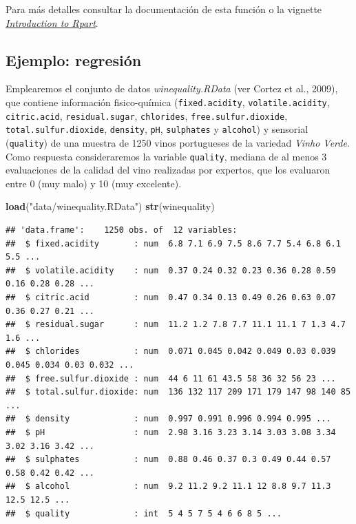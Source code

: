 \documentclass[
]{book}
\newenvironment{Shaded}{\begin{snugshade}}{\end{snugshade}}
\newcommand{\KeywordTok}[1]{\textcolor[rgb]{0.13,0.29,0.53}{\textbf{#1}}}
\newcommand{\NormalTok}[1]{#1}
\newcommand{\StringTok}[1]{\textcolor[rgb]{0.31,0.60,0.02}{#1}}
\theoremstyle{break}
\theoremstyle{definition}
\theoremstyle{definition}
\theoremstyle{definition}
\theoremstyle{remark}
\begin{document}
Para más detalles consultar la documentación de esta función o la vignette \href{https://cran.r-project.org/web/packages/rpart/vignettes/longintro.pdf}{\emph{Introduction to Rpart}}.

\hypertarget{ejemplo-regresiuxf3n}{%
\subsection{Ejemplo: regresión}\label{ejemplo-regresiuxf3n}}

Emplearemos el conjunto de datos \emph{winequality.RData} (ver Cortez et al., 2009), que contiene información fisico-química
(\texttt{fixed.acidity}, \texttt{volatile.acidity}, \texttt{citric.acid}, \texttt{residual.sugar}, \texttt{chlorides}, \texttt{free.sulfur.dioxide},
\texttt{total.sulfur.dioxide}, \texttt{density}, \texttt{pH}, \texttt{sulphates} y \texttt{alcohol}) y sensorial (\texttt{quality})
de una muestra de 1250 vinos portugueses de la variedad \emph{Vinho Verde}.
Como respuesta consideraremos la variable \texttt{quality}, mediana de al menos 3 evaluaciones de la calidad del vino
realizadas por expertos, que los evaluaron entre 0 (muy malo) y 10 (muy excelente).

\begin{Shaded}
\begin{Highlighting}[]
\KeywordTok{load}\NormalTok{(}\StringTok{"data/winequality.RData"}\NormalTok{)}
\KeywordTok{str}\NormalTok{(winequality)}
\end{Highlighting}
\end{Shaded}

\begin{verbatim}
## 'data.frame':    1250 obs. of  12 variables:
##  $ fixed.acidity       : num  6.8 7.1 6.9 7.5 8.6 7.7 5.4 6.8 6.1 5.5 ...
##  $ volatile.acidity    : num  0.37 0.24 0.32 0.23 0.36 0.28 0.59 0.16 0.28 0.28 ...
##  $ citric.acid         : num  0.47 0.34 0.13 0.49 0.26 0.63 0.07 0.36 0.27 0.21 ...
##  $ residual.sugar      : num  11.2 1.2 7.8 7.7 11.1 11.1 7 1.3 4.7 1.6 ...
##  $ chlorides           : num  0.071 0.045 0.042 0.049 0.03 0.039 0.045 0.034 0.03 0.032 ...
##  $ free.sulfur.dioxide : num  44 6 11 61 43.5 58 36 32 56 23 ...
##  $ total.sulfur.dioxide: num  136 132 117 209 171 179 147 98 140 85 ...
##  $ density             : num  0.997 0.991 0.996 0.994 0.995 ...
##  $ pH                  : num  2.98 3.16 3.23 3.14 3.03 3.08 3.34 3.02 3.16 3.42 ...
##  $ sulphates           : num  0.88 0.46 0.37 0.3 0.49 0.44 0.57 0.58 0.42 0.42 ...
##  $ alcohol             : num  9.2 11.2 9.2 11.1 12 8.8 9.7 11.3 12.5 12.5 ...
##  $ quality             : int  5 4 5 7 5 4 6 6 8 5 ...
\end{verbatim}
\end{document}
